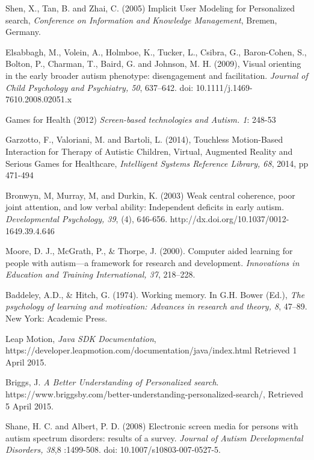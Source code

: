 \documentclass[a4paper, 10pt]{article}
\begin{document}
\begin{thebibliography}{100}
Shen, X., Tan, B. and Zhai, C. (2005) Implicit User Modeling for Personalized search, \textit{Conference on Information and Knowledge Management}, Bremen, Germany.

Elsabbagh, M., Volein, A., Holmboe, K., Tucker, L., Csibra, G., Baron-Cohen, S., Bolton, P., Charman, T., Baird, G. and Johnson, M. H. (2009), Visual orienting in the early broader autism phenotype: disengagement and facilitation. \textit{Journal of Child Psychology and Psychiatry, 50}, 637–642. doi: 10.1111/j.1469-7610.2008.02051.x

 Games for Health (2012) \textit{Screen-based technologies and Autism. 1}: 248-53

 Garzotto, F., Valoriani, M. and Bartoli, L. (2014), Touchless Motion-Based Interaction for Therapy of Autistic Children, Virtual, Augmented Reality and Serious Games for Healthcare, \textit{Intelligent Systems Reference Library, 68}, 2014, pp 471-494

 Bronwyn, M, Murray, M, and Durkin, K. (2003) Weak central coherence, poor joint attention, and low verbal ability: Independent deficits in early autism. \textit{Developmental Psychology, 39}, (4), 646-656. http://dx.doi.org/10.1037/0012-1649.39.4.646

Moore, D. J., McGrath, P., \& Thorpe, J. (2000). Computer aided learning for people with autism—a framework for research and development. \textit{Innovations in Education and Training International, 37}, 218–228.

Baddeley, A.D., \& Hitch, G. (1974). Working memory. In G.H. Bower (Ed.), \textit{The psychology of learning and motivation: Advances in research and theory, 8}, 47–89. New York: Academic Press.

 Leap Motion, \textit{Java SDK Documentation}, \\https://developer.leapmotion.com/documentation/java/index.html Retrieved 1 April 2015.

Briggs, J. \textit{A Better Understanding of Personalized search}. https://www.briggsby.com/better-understanding-personalized-search/, Retrieved 5 April 2015.

Shane, H. C. and Albert, P. D. (2008) Electronic screen media for persons with autism spectrum disorders: results of a survey. \textit{Journal of Autism Developmental Disorders, 38},8 :1499-508. doi: 10.1007/s10803-007-0527-5.


\end{thebibliography}
\end{document}
